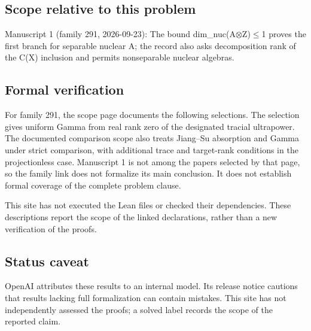 \documentclass[11pt]{article}
\begin{document}
\subsection{Scope relative to this problem}
Manuscript 1 (family 291, 2026-09-23): The bound dim\_nuc(A\(\otimes\)Z)\(\leq\)1 proves the first branch for separable nuclear A; the record also asks decomposition rank of the C(X) inclusion and permits nonseparable nuclear algebras.

\subsection{Formal verification}
For family 291, the scope page documents the following selections. The selection gives uniform Gamma from real rank zero of the designated tracial ultrapower. The documented comparison scope also treats Jiang--Su absorption and Gamma under strict comparison, with additional trace and target-rank conditions in the projectionless case. Manuscript 1 is not among the papers selected by that page, so the family link does not formalize its main conclusion. It does not establish formal coverage of the complete problem clause.

This site has not executed the Lean files or checked their dependencies. These descriptions report the scope of the linked declarations, rather than a new verification of the proofs.

\subsection{Status caveat}
OpenAI attributes these results to an internal model. Its release notice cautions that results lacking full formalization can contain mistakes. This site has not independently assessed the proofs; a solved label records the scope of the reported claim.
\end{document}
